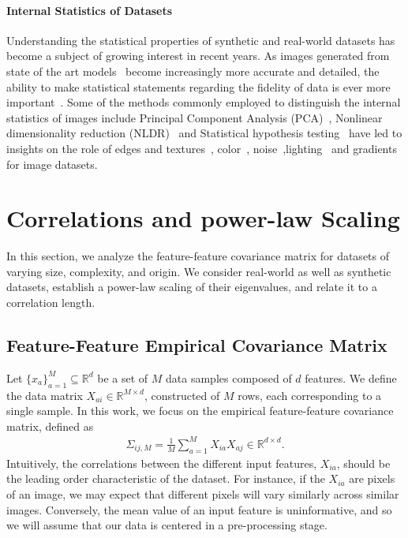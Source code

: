 \documentclass{article}
\begin{document}
%
\paragraph{Internal Statistics of Datasets}
Understanding the statistical properties of synthetic and real-world datasets has become a subject of growing interest in recent years. As images generated from state of the art models~\cite{midjourney,rombach2021highresolution,masood2021deepfakes} become increasingly more accurate and detailed, the ability to make statistical statements regarding the fidelity of data is ever more important~\cite{goodfellow2015explaining,carlini2017evaluating,rössler2019faceforensics, deepfakedetection2}.
Some of the methods commonly employed to distinguish the internal statistics of images include Principal Component Analysis (PCA)~\cite{pearson1901liii,PCA}, Nonlinear dimensionality reduction (NLDR)~\cite{kempfert2019comparison,Das_2022,AYESHA202044} and Statistical hypothesis testing~\cite{nuzzo2014statistical, hao2022deepfake} have led to insights on the role of edges and textures~\cite{5583264}, color~\cite{8355817}, noise~\cite{yue2020variational},lighting~\cite{Dror2004StatisticalCO} and gradients~\cite{5995401} for image datasets.



\section{Correlations and power-law Scaling}

In this section, we analyze the feature-feature covariance matrix for datasets of varying size, complexity, and origin. We consider real-world as well as synthetic datasets, establish a power-law scaling of their eigenvalues, and relate it to a correlation length.

\subsection{Feature-Feature Empirical Covariance Matrix}
\label{sec:covariance matrix}
Let $\{ x_a\}_{a=1}^{M} \subseteq \mathbb{R}^d $ be a set of $M$ data samples composed of $d$ features. We define the data matrix $X_{a i} \in \mathbb{R}^{M\times d} $, constructed of $M$ rows, each corresponding to a single sample. In this work, we focus on the empirical feature-feature covariance matrix, defined as
\begin{align}
\label{eq:empirical_covariance}
    \Sigma_{ij,M}=
    \frac{1}{M}\sum_{a = 1}^{M}
    X_{i a}
    X_{a j}
     \in \mathbb{R}^{d\times d}.
\end{align}
Intuitively, the correlations between the different input features, $X_{ia}$, should be the leading order characteristic of the dataset. For instance, if the $X_{ia}$ are pixels of an image, we may expect that different
pixels will vary similarly across similar images. Conversely, the mean value of an input feature is uninformative, and so we will assume that our data is centered in a pre-processing stage. 
\end{document}

